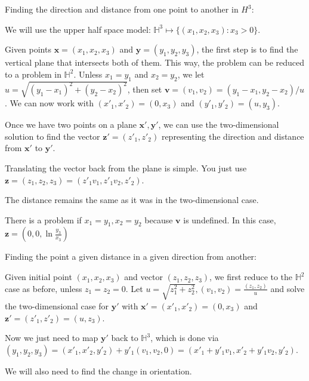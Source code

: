 \documentclass[12pt]{amsart}
\begin{document}
Finding the direction and distance from one point to another in $H^3$:

We will use the upper half space model: $\mathbb{H}^3 \mapsto \{(x_1,x_2,x_3):x_3 > 0\}$.

Given points $\textbf{x} = (x_1,x_2,x_3)$ and $\textbf{y} = (y_1,y_2,y_3)$, the first step is to find the vertical plane that intersects both of them. This way, the problem can be reduced to a problem in $\mathbb{H}^2$. Unless $x_1 = y_1$ and $x_2 = y_2$, we let $u = \sqrt{(y_1-x_1)^2 + (y_2-x_2)^2}$, then set $\textbf{v} = (v_1,v_2) = (y_1-x_1,y_2-x_2)/u$. We can now work with $(x'_1,x'_2) = (0,x_3)$ and $(y'_1,y'_2) = (u,y_3)$.

Once we have two points on a plane $\textbf{x}', \textbf{y}'$, we can use the two-dimensional solution to find the vector $\textbf{z}' = (z'_1,z'_2)$ representing the direction and distance from $\textbf{x}'$ to $\textbf{y}'$.

Translating the vector back from the plane is simple. You just use $\textbf{z} = (z_1,z_2,z_3) = (z'_1v_1,z'_1v_2,z'_2)$.

The distance remains the same as it was in the two-dimensional case.

There is a problem if $x_1 = y_1, x_2 = y_2$ because $\textbf{v}$ is undefined. In this case, $\textbf{z} = (0,0,\ln\frac{y_3}{x_3})$ %

\bigskip

Finding the point a given distance in a given direction from another:

\bigskip

Given initial point $(x_1,x_2,x_3)$ and vector $(z_1,z_2,z_3)$, we first reduce to the $\mathbb{H}^2$ case as before, unless $z_1 = z_2 = 0$. Let $u = \sqrt{z_1^2+z_2^2}, (v_1,v_2) = \frac{(z_1,z_2)}{u}$ and solve the two-dimensional case for $\textbf{y}'$ with $\textbf{x}' = (x'_1,x'_2) = (0,x_3)$ and $\textbf{z}' = (z'_1,z'_2) = (u,z_3)$.

Now we just need to map $\textbf{y}'$ back to $\mathbb{H}^3$, which is done via $(y_1,y_2,y_3) = (x'_1,x'_2,y'_2)+y'_1(v_1,v_2,0) = (x'_1+y'_1v_1,x'_2+y'_1v_2,y'_2)$.

We will also need to find the change in orientation.
\end{document}
